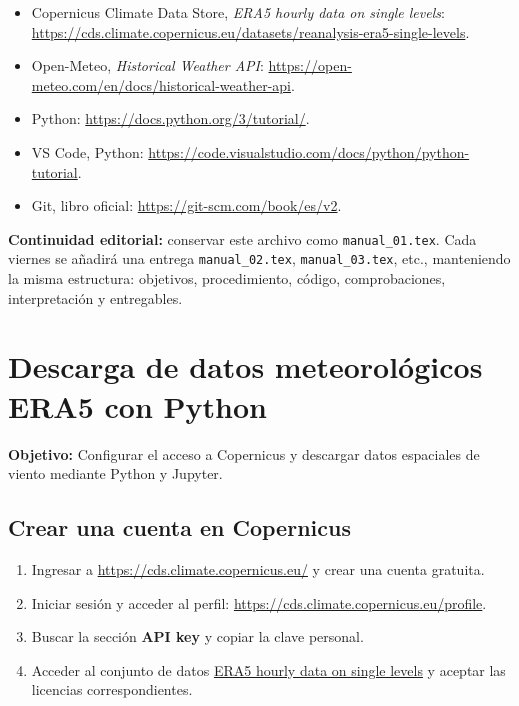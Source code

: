 \documentclass[11pt,a4paper]{article}
\begin{document}
\begin{itemize}[leftmargin=*]

\item Copernicus Climate Data Store, \emph{ERA5 hourly data on single levels}: \url{https://cds.climate.copernicus.eu/datasets/reanalysis-era5-single-levels}.

\item Open-Meteo, \emph{Historical Weather API}: \url{https://open-meteo.com/en/docs/historical-weather-api}.

\item Python: \url{https://docs.python.org/3/tutorial/}.

\item VS Code, Python: \url{https://code.visualstudio.com/docs/python/python-tutorial}.

\item Git, libro oficial: \url{https://git-scm.com/book/es/v2}.

\end{itemize}

\textbf{Continuidad editorial:} conservar este archivo como \texttt{manual\_01.tex}. Cada viernes se añadirá una entrega \texttt{manual\_02.tex}, \texttt{manual\_03.tex}, etc., manteniendo la misma estructura: objetivos, procedimiento, código, comprobaciones, interpretación y entregables.


\section{Descarga de datos meteorológicos ERA5 con Python}

\textbf{Objetivo:} Configurar el acceso a Copernicus y descargar
datos espaciales de viento mediante Python y Jupyter.

\subsection{Crear una cuenta en Copernicus}

\begin{enumerate}

    \item Ingresar a \url{https://cds.climate.copernicus.eu/}
    y crear una cuenta gratuita.

    \item Iniciar sesión y acceder al perfil:
    \url{https://cds.climate.copernicus.eu/profile}.

    \item Buscar la sección \textbf{API key} y copiar
    la clave personal.

    \item Acceder al conjunto de datos
    \href{https://cds.climate.copernicus.eu/datasets/reanalysis-era5-single-levels}{ERA5 hourly data on single levels}
    y aceptar las licencias correspondientes.

\end{enumerate}
\end{document}
